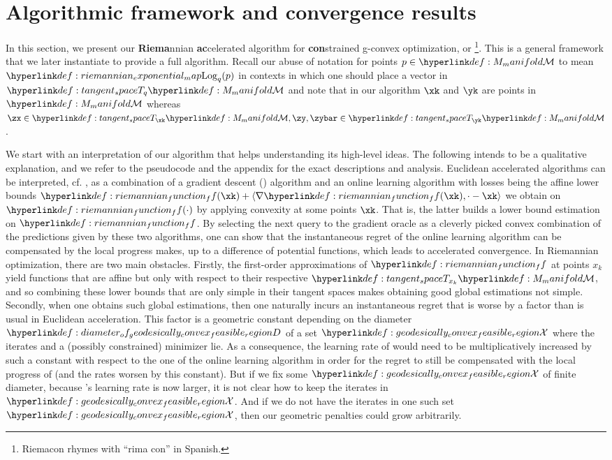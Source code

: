 \documentclass[12pt]{alt2021}
\newcommand{\innp}[1]{\langle #1 \rangle}
\begin{document}
\section{Algorithmic framework and convergence results}\label{sec:algorithm}
In this section, we present our \textbf{Riema}nnian \textbf{ac}celerated algorithm for \textbf{con}strained g-convex optimization, or \footnote{Riemacon rhymes with ``rima con'' in Spanish.}. This is a general framework that we later instantiate to provide a full algorithm. Recall our abuse of notation for points $p \in\M$ to mean $\exponinv{q}(p)$ in contexts in which one should place a vector in $\Tansp{q}\M$ and note that in our algorithm $\xk$ and $\yk$ are points in $\M$ whereas $\zx \in \Tansp{\xk}\M, \zy, \zybar  \in \Tansp{\yk}\M$.




We start with an interpretation of our algorithm that helps understanding its high-level ideas. The following intends to be a qualitative explanation, and we refer to the pseudocode and the appendix for the exact descriptions and analysis. Euclidean accelerated algorithms can be interpreted, cf. \citep{allen2014linear}, as a combination of a gradient descent () algorithm and an online learning algorithm with losses being the affine lower bounds $\f(\xk) + \innp{\nabla \f(\xk), \cdot-\xk}$ we obtain on $\f(\cdot)$ by applying convexity at some points $\xk$. That is, the latter builds a lower bound estimation on $\f$. By selecting the next query to the gradient oracle as a cleverly picked convex combination of the predictions given by these two algorithms, one can show that the instantaneous regret of the online learning algorithm can be compensated by the local progress \GD{} makes, up to a difference of potential functions, which leads to accelerated convergence. In Riemannian optimization, there are two main obstacles. Firstly, the first-order approximations of $\f$ at points $x_k$ yield functions that are affine but only with respect to their respective $\Tansp{x_k}\M$, and so combining these lower bounds that are only simple in their tangent spaces makes obtaining good global estimations not simple. Secondly, when one obtains such global estimations, then one naturally incurs an instantaneous regret that is worse by a factor than is usual in Euclidean acceleration. This factor is a geometric constant depending on the diameter $\D$ of a set $\X$ where the iterates and a (possibly constrained) minimizer lie. As a consequence, the learning rate of \GD{} would need to be multiplicatively increased by such a constant with respect to the one of the online learning algorithm in order for the regret to still be compensated with the local progress of \GD{} (and the rates worsen by this constant). But if we fix some $\X$ of finite diameter, because \GD{}'s learning rate is now larger, it is not clear how to keep the iterates in $\X$. And if we do not have the iterates in one such set $\X$, then our geometric penalties could grow arbitrarily. 
\end{document}
